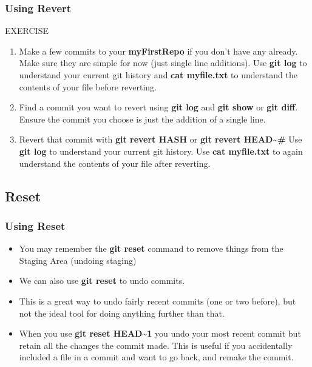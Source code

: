 \documentclass{beamer}
\begin{document}
\begin{frame}[fragile]
	\frametitle{Using Revert}
	\begin{block}{EXERCISE}
		\begin{enumerate}
			\item Make a few commits to your \textbf{myFirstRepo} if you don't have any already. Make sure they are simple for now (just single line additions). Use \textbf{git log} to understand your current git history and \textbf{cat myfile.txt} to understand the contents of your file before reverting.
			\item Find a commit you want to revert using \textbf{git log} and \textbf{git show} or \textbf{git diff}. Ensure the commit you choose is just the addition of a single line. 
			\item Revert that commit with \textbf{git revert \textlangle{}HASH\textrangle{}} or \textbf{git revert HEAD\textasciitilde\textlangle{}\#\textrangle{}} Use \textbf{git log} to understand your current git history. Use \textbf{cat myfile.txt} to again understand the contents of your file after reverting.
		\end{enumerate}
	\end{block}
\end{frame}

\subsection{Reset}

\begin{frame}[fragile]
	\frametitle{Using Reset}
	\begin{itemize}
		\item You may remember the \textbf{git reset} command to remove things from the Staging Area (undoing staging)
		\item We can also use \textbf{git reset} to undo commits. 
		\item This is a great way to undo fairly recent commits (one or two before), but not the ideal tool for doing anything further than that. 
		\item When you use \textbf{git reset HEAD\textasciitilde1} you undo your most recent commit but retain all the changes the commit made. This is useful if you accidentally included a file in a commit and want to go back, and remake the commit.  
	\end{itemize}
\end{frame}
\end{document}
